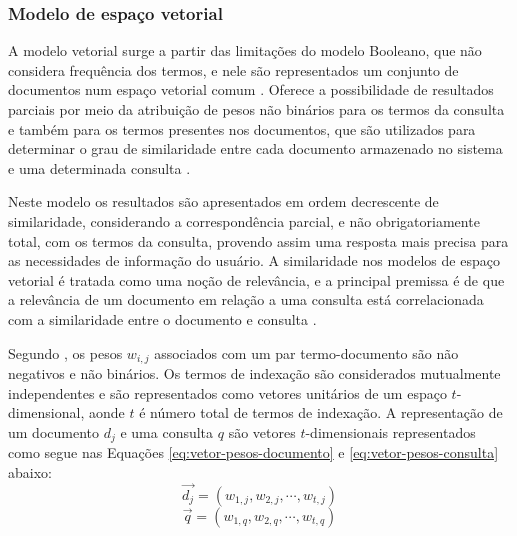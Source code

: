     \subsubsection{Modelo de espaço vetorial} \label{subsubsec:Modelo-espaço-vetorial}
    
    
    
        A modelo vetorial surge a partir das limitações do modelo Booleano, que não considera frequência dos termos, e nele são representados um conjunto de documentos num espaço vetorial comum \cite[p.~110]{Manning2008IIR}.
        Oferece a possibilidade de resultados parciais por meio da atribuição de pesos não binários para os termos da consulta e também para os termos presentes nos documentos, que são utilizados para determinar o grau de similaridade entre cada documento armazenado no sistema e uma determinada consulta \cite[p.~77]{Baeza-Yates2011}.
        
        Neste modelo os resultados são apresentados em ordem decrescente de similaridade, considerando a correspondência parcial, e não obrigatoriamente total, com os termos da consulta, provendo assim uma resposta mais precisa para as necessidades de informação do usuário.
        A similaridade nos modelos de espaço vetorial é tratada como uma noção de relevância, e a principal premissa é de que a relevância de um documento em relação a uma consulta está correlacionada com a similaridade entre o documento e consulta \cite[p.~110]{Zhai2016TDMA}.
        
        Segundo , os pesos $w_{i,j}$ associados com um par termo-documento são não negativos e não binários.
        Os termos de indexação são considerados mutualmente independentes e são representados como vetores unitários de um espaço $t$-dimensional, aonde $t$ é número total de termos de indexação.
        A representação de um documento $d_j$ e uma consulta $q$ são vetores $t$-dimensionais representados como segue nas Equações \ref{eq:vetor-pesos-documento} e \ref{eq:vetor-pesos-consulta} abaixo:
        \begin{equation}
            \label{eq:vetor-pesos-documento}
    		\vec{d_j} = (w_{1,j}, w_{2,j}, \cdots , w_{t,j})
        \end{equation}
        \begin{equation}
            \label{eq:vetor-pesos-consulta}
    		\vec{q} = (w_{1,q}, w_{2,q}, \cdots , w_{t,q})
        \end{equation}
        
